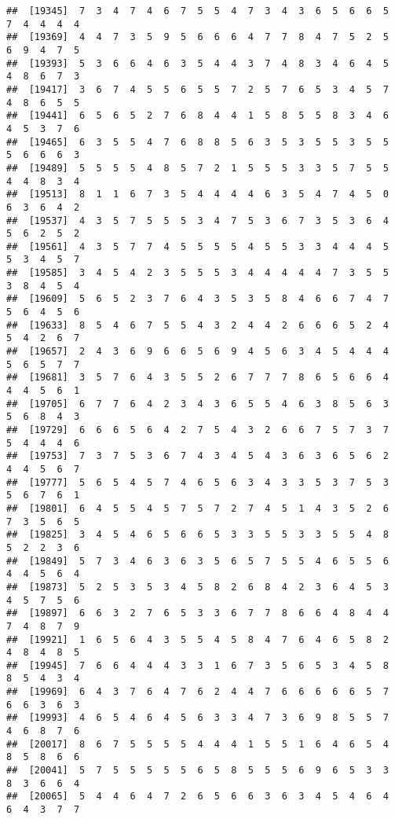 \documentclass[
]{book}
\begin{document}
\begin{verbatim}
##  [19345]  7  3  4  7  4  6  7  5  5  4  7  3  4  3  6  5  6  6  5  7  4  4  4  4
##  [19369]  4  4  7  3  5  9  5  6  6  6  4  7  7  8  4  7  5  2  5  6  9  4  7  5
##  [19393]  5  3  6  6  4  6  3  5  4  4  3  7  4  8  3  4  6  4  5  4  8  6  7  3
##  [19417]  3  6  7  4  5  5  6  5  5  7  2  5  7  6  5  3  4  5  7  4  8  6  5  5
##  [19441]  6  5  6  5  2  7  6  8  4  4  1  5  8  5  5  8  3  4  6  4  5  3  7  6
##  [19465]  6  3  5  5  4  7  6  8  8  5  6  3  5  3  5  5  3  5  5  5  6  6  6  3
##  [19489]  5  5  5  5  4  8  5  7  2  1  5  5  5  3  3  5  7  5  5  4  4  8  3  4
##  [19513]  8  1  1  6  7  3  5  4  4  4  4  6  3  5  4  7  4  5  0  6  3  6  4  2
##  [19537]  4  3  5  7  5  5  5  3  4  7  5  3  6  7  3  5  3  6  4  5  6  2  5  2
##  [19561]  4  3  5  7  7  4  5  5  5  5  4  5  5  3  3  4  4  4  5  5  3  4  5  7
##  [19585]  3  4  5  4  2  3  5  5  5  3  4  4  4  4  4  7  3  5  5  3  8  4  5  4
##  [19609]  5  6  5  2  3  7  6  4  3  5  3  5  8  4  6  6  7  4  7  5  6  4  5  6
##  [19633]  8  5  4  6  7  5  5  4  3  2  4  4  2  6  6  6  5  2  4  5  4  2  6  7
##  [19657]  2  4  3  6  9  6  6  5  6  9  4  5  6  3  4  5  4  4  4  5  6  5  7  7
##  [19681]  3  5  7  6  4  3  5  5  2  6  7  7  7  8  6  5  6  6  4  4  4  5  6  1
##  [19705]  6  7  7  6  4  2  3  4  3  6  5  5  4  6  3  8  5  6  3  5  6  8  4  3
##  [19729]  6  6  6  5  6  4  2  7  5  4  3  2  6  6  7  5  7  3  7  5  4  4  4  6
##  [19753]  7  3  7  5  3  6  7  4  3  4  5  4  3  6  3  6  5  6  2  4  4  5  6  7
##  [19777]  5  6  5  4  5  7  4  6  5  6  3  4  3  3  5  3  7  5  3  5  6  7  6  1
##  [19801]  6  4  5  5  4  5  7  5  7  2  7  4  5  1  4  3  5  2  6  7  3  5  6  5
##  [19825]  3  4  5  4  6  5  6  6  5  3  3  5  5  3  3  5  5  4  8  5  2  2  3  6
##  [19849]  5  7  3  4  6  3  6  3  5  6  5  7  5  5  4  6  5  5  6  4  4  5  6  4
##  [19873]  5  2  5  3  5  3  4  5  8  2  6  8  4  2  3  6  4  5  3  4  5  7  5  6
##  [19897]  6  6  3  2  7  6  5  3  3  6  7  7  8  6  6  4  8  4  4  7  4  8  7  9
##  [19921]  1  6  5  6  4  3  5  5  4  5  8  4  7  6  4  6  5  8  2  4  8  4  8  5
##  [19945]  7  6  6  4  4  4  3  3  1  6  7  3  5  6  5  3  4  5  8  8  5  4  3  4
##  [19969]  6  4  3  7  6  4  7  6  2  4  4  7  6  6  6  6  6  5  7  6  6  3  6  3
##  [19993]  4  6  5  4  6  4  5  6  3  3  4  7  3  6  9  8  5  5  7  4  6  8  7  6
##  [20017]  8  6  7  5  5  5  5  4  4  4  1  5  5  1  6  4  6  5  4  8  5  8  6  6
##  [20041]  5  7  5  5  5  5  5  6  5  8  5  5  5  6  9  6  5  3  3  8  3  6  6  4
##  [20065]  5  4  4  6  4  7  2  6  5  6  6  3  6  3  4  5  4  6  4  6  4  3  7  7

\end{verbatim}
\end{document}
